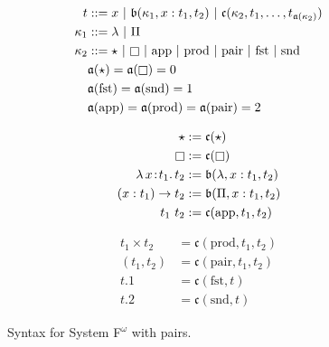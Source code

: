 
\begin{figure}
    \centering
    \begin{align*}
        t &::= x\ |\ \mathfrak{b}(\kappa_1, x : t_1, t_2)\ |\ \mathfrak{c}(\kappa_2, t_1, \ldots, t_{\mathfrak{a}(\kappa_2)}) \\
        \kappa_1 &::= \lambda\ |\ \Pi \\
        \kappa_2 &::=\star\ |\ \kind\ |\ \text{app}\ |\ \text{prod}\ |\ \text{pair}\ |\ \text{fst}\ |\ \text{snd} \\
        &\mathfrak{a}(\star) = \mathfrak{a}(\kind) = 0 \\
        &\mathfrak{a}(\text{fst}) = \mathfrak{a}(\text{snd}) = 1 \\
        &\mathfrak{a}(\text{app}) = \mathfrak{a}(\text{prod}) = \mathfrak{a}(\text{pair}) = 2
    \end{align*}
    \vspace{-.4in}
    \begin{minipage}{0.5\textwidth}
        \begin{align*}
            \star &:= \mathfrak{c}(\star) \\
            \kind &:= \mathfrak{c}(\kind) \\
            \abs{\lambda}{x}{t_1}{t_2} &:= \mathfrak{b}(\lambda, x : t_1, t_2) \\
            (x : t_1) \to t_2 &:= \mathfrak{b}(\Pi, x : t_1, t_2) \\
            t_1\ t_2 &:= \mathfrak{c}(\text{app}, t_1, t_2)
        \end{align*}
    \end{minipage}%
    \begin{minipage}{0.5\textwidth}
        \begin{align*}
            t_1 \times t_2 &= \mathfrak{c}(\text{prod}, t_1, t_2) \\
            (t_1, t_2) &= \mathfrak{c}(\text{pair}, t_1, t_2) \\
            t.1 &= \mathfrak{c}(\text{fst}, t) \\
            t.2 &= \mathfrak{c}(\text{snd}, t)
        \end{align*}
    \end{minipage}
    \caption{Syntax for System F$^\omega$ with pairs.}
    \label{fig:syntax_fp}
\end{figure}
